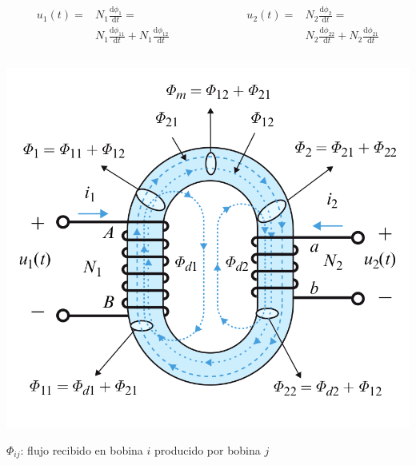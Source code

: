\documentclass[xcolor={usenames,svgnames,dvipsnames}]{beamer}
\begin{document}
\begin{frame}[label={sec:orgcc0b447},plain]{}
\begin{columns}
\begin{column}{0.5\columnwidth}
\begin{align*}
  u_1(t) = &N_1 \frac{\mathrm{d}\phi_1}{\mathrm{d}t} = \\
  &N_1 \frac{\mathrm{d}\phi_{11}}{\mathrm{d}t} + N_1 \frac{\mathrm{d}\phi_{12}}{\mathrm{d}t}
\end{align*}
\end{column}

\begin{column}{0.5\columnwidth}
\begin{align*}
  u_2(t) = &N_2 \frac{\mathrm{d}\phi_2}{\mathrm{d}t} = \\
  &N_2 \frac{\mathrm{d}\phi_{22}}{\mathrm{d}t} + N_2 \frac{\mathrm{d}\phi_{21}}{\mathrm{d}t}
\end{align*}
\end{column}
\end{columns}

\begin{center}
\includegraphics[height=0.65\textheight]{figs/Acoplamiento1.png}
\end{center}

\begin{center}
\(\Phi_{ij}\): flujo recibido en bobina \(i\) producido por bobina \(j\)
\end{center}
\end{frame}
\end{document}
